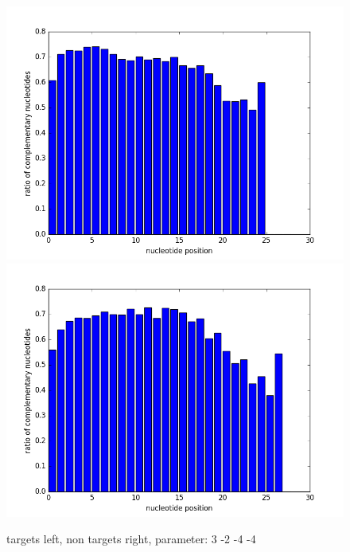 \documentclass[12pt]{article}
\begin{document}
\begin{figure}
\includegraphics[scale=0.2]{results/ratio3-2-4-4.png}
\includegraphics[scale=0.2]{results/non-ratio3-2-4-4.png}
\caption {targets left, non targets right, parameter: 3 -2 -4 -4}
\label{fig:plot4}
\end{figure}
\end{document}
